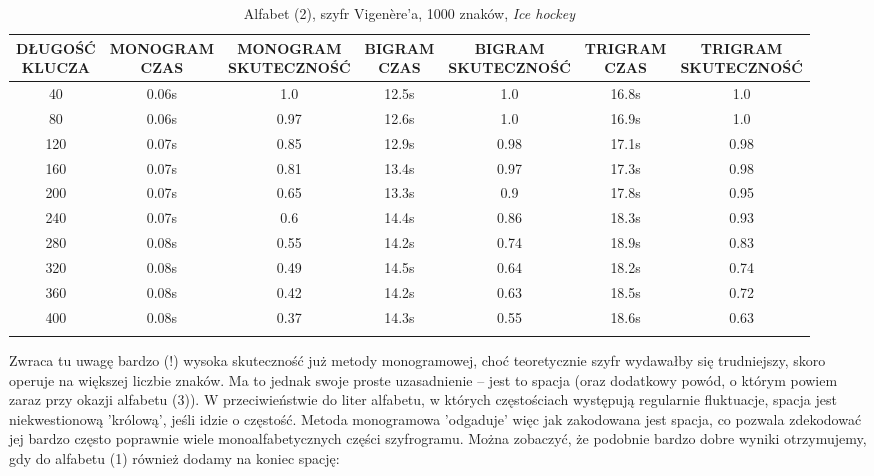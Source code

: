 \documentclass[a4paper]{article}
\theoremstyle{defn}
\theoremstyle{theorem}
\theoremstyle{lemma}
\theoremstyle{cor}
\theoremstyle{fact}
\begin{document}
\begin{center}\begin{small}\begin{longtable}{|c|c|c|c|c|c|c|} 
\hline \makecell{DŁUGOŚĆ\\KLUCZA} &  \makecell{MONOGRAM\\CZAS} & \makecell{MONOGRAM\\SKUTECZNOŚĆ} & \makecell{BIGRAM\\CZAS} &  \makecell{BIGRAM\\SKUTECZNOŚĆ} & \makecell{TRIGRAM\\CZAS} & \makecell{TRIGRAM\\SKUTECZNOŚĆ}\\ \hline 
40 & 0.06s & 1.0 & 12.5s & 1.0 & 16.8s & 1.0 \\ \hline 
80 & 0.06s & 0.97 & 12.6s & 1.0 & 16.9s & 1.0 \\ \hline 
120 & 0.07s & 0.85 & 12.9s & 0.98 & 17.1s & 0.98 \\ \hline 
160 & 0.07s & 0.81 & 13.4s & 0.97 & 17.3s & 0.98 \\ \hline 
200 & 0.07s & 0.65 & 13.3s & 0.9 & 17.8s & 0.95 \\ \hline 
240 & 0.07s & 0.6 & 14.4s & 0.86 & 18.3s & 0.93 \\ \hline 
280 & 0.08s & 0.55 & 14.2s & 0.74 & 18.9s & 0.83 \\ \hline 
320 & 0.08s & 0.49 & 14.5s & 0.64 & 18.2s & 0.74 \\ \hline 
360 & 0.08s & 0.42 & 14.2s & 0.63 & 18.5s & 0.72 \\ \hline 
400 & 0.08s & 0.37 & 14.3s & 0.55 & 18.6s & 0.63 \\ \hline 
\caption{Alfabet (2), szyfr Vigenère'a, 1000 znaków, \textit{Ice hockey}}
\end{longtable}\end{small}\end{center} 
Zwraca tu uwagę bardzo (!) wysoka skuteczność już metody monogramowej, choć teoretycznie szyfr wydawałby się trudniejszy, skoro operuje na większej liczbie znaków. Ma to jednak swoje proste uzasadnienie – jest to spacja (oraz dodatkowy powód, o którym powiem zaraz przy okazji alfabetu (3)). W przeciwieństwie do liter alfabetu, w których częstościach występują regularnie fluktuacje, spacja jest niekwestionową 'królową', jeśli idzie o częstość. Metoda monogramowa 'odgaduje' więc jak zakodowana jest spacja, co pozwala zdekodować jej bardzo często poprawnie wiele monoalfabetycznych części szyfrogramu. Można zobaczyć, że podobnie bardzo dobre wyniki otrzymujemy, gdy do alfabetu (1) również dodamy na koniec spację:
\end{document}
